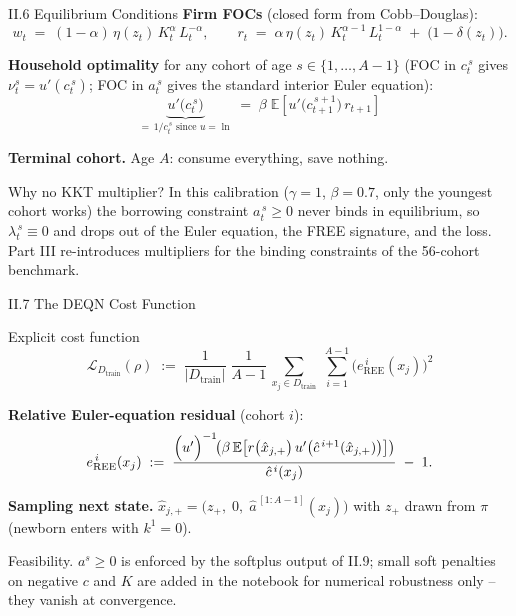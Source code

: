 \documentclass[aspectratio=169,11pt]{beamer}
\newcommand{\emphc}[1]{\textcolor{harvardcrimson}{#1}}
\newcommand{\E}[1]{\mathbb{E}\!\left[#1\right]}
\newcommand{\Loss}{\mathcal{L}}
\begin{document}
\begin{frame}{II.6 Equilibrium Conditions}
\small
\textbf{Firm FOCs} (closed form from Cobb--Douglas):
\[
w_t \;=\; (1-\alpha)\,\eta(z_t)\, K_t^{\alpha}\, L_t^{-\alpha}, \qquad
r_t \;=\; \alpha\,\eta(z_t)\, K_t^{\alpha-1}\, L_t^{1-\alpha} \;+\; \bigl(1-\delta(z_t)\bigr).
\]

\vspace{0.3em}
\textbf{Household optimality} for any cohort of age $s \in \{1, \ldots, A-1\}$ (FOC in $c_t^{\,s}$ gives $\nu_t^s = u'(c_t^{\,s})$; FOC in $a_t^{\,s}$ gives the standard \emphc{interior} Euler equation):
\[
\boxed{\;\underbrace{u'\!\bigl(c_t^{\,s}\bigr)}_{=\,1/c_t^{\,s}\text{ since }u=\ln} \;=\; \beta\;\E{u'\!\bigl(c_{t+1}^{\,s+1}\bigr)\,r_{t+1}}\;}
\]

\vspace{0.3em}
\textbf{Terminal cohort.}  Age $A$: consume everything, save nothing.

\vspace{0.3em}
{\scriptsize \emphc{Why no KKT multiplier?}  In this calibration ($\gamma=1$, $\beta=0.7$, only the youngest cohort works) the borrowing constraint $a_t^{\,s}\ge 0$ never binds in equilibrium, so $\lambda_t^{\,s}\equiv 0$ and drops out of the Euler equation, the FREE signature, and the loss.  Part III re-introduces multipliers for the binding constraints of the 56-cohort benchmark.}
\end{frame}


\begin{frame}{II.7 The DEQN Cost Function}
\small
\begin{block}{Explicit cost function}
\[
\boxed{\;\Loss_{D_{\text{train}}}(\rho) \;:=\; \frac{1}{|D_{\text{train}}|}\;\frac{1}{A-1}\,
\sum_{x_j \in D_{\text{train}}}\;\sum_{i=1}^{A-1} \bigl(e_{\text{REE}}^{\,i}(x_j)\bigr)^2\;}
\]
\end{block}

\vspace{0.3em}
\textbf{Relative Euler-equation residual} (cohort $i$):
\[
e_{\text{REE}}^{\,i}(x_j) \;:=\;
\frac{\Bigl(u'\Bigr)^{-1}\!\!\left(\beta\,\E{r\bigl(\hat x_{j,+}\bigr)\,u'\bigl(\hat c^{\,i+1}(\hat x_{j,+})\bigr)}\right)}{\hat c^{\,i}(x_j)} \;-\; 1.
\]

\vspace{0.2em}
\textbf{Sampling next state.}  $\hat x_{j,+} = \bigl(z_+,\; 0,\; \hat a^{\,[1:A-1]}(x_j)\bigr)$ with $z_+$ drawn from $\pi$ (newborn enters with $k^1 = 0$).

\vspace{0.2em}
{\scriptsize \emphc{Feasibility.}  $a^s\ge 0$ is enforced by the softplus output of II.9; small soft penalties on negative $c$ and $K$ are added in the notebook for numerical robustness only -- they vanish at convergence.}
\end{frame}
\end{document}
